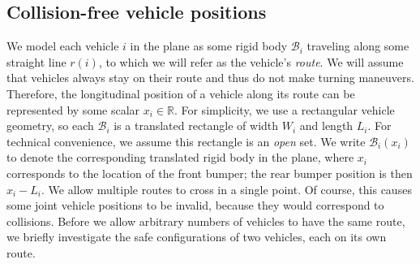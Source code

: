 \documentclass[a4paper]{report}
\theoremstyle{definition}
\theoremstyle{plain}
\begin{document}
\subsection{Collision-free vehicle positions}\label{sec:valid-configs}
%
We model each vehicle $i$ in the plane as some rigid body $\mathcal{B}_{i}$
traveling along some straight line $r(i)$, to which we will refer as the
vehicle's \emph{route}.
%
We will assume that vehicles always stay on their route and thus do not make
turning maneuvers.
%
Therefore, the longitudinal position of a vehicle along its route can be
represented by some scalar $x_{i} \in \mathbb{R}$.
%
For simplicity, we use a rectangular vehicle geometry, so each $\mathcal{B}_{i}$
is a translated rectangle of width $W_{i}$ and length $L_{i}$. For technical
convenience, we assume this rectangle is an \emph{open} set. We write
$\mathcal{B}_{i}(x_{i})$ to denote the corresponding translated rigid body in
the plane, where $x_{i}$ corresponds to the location of the front bumper; the
rear bumper position is then $x_{i} - L_{i}$.
%
We allow multiple routes to cross in a single point. Of course, this causes some
joint vehicle positions to be invalid, because they would correspond to
collisions.
%
Before we allow arbitrary numbers of vehicles to have the same route, we briefly
investigate the safe configurations of two vehicles, each on its own route.
\end{document}
